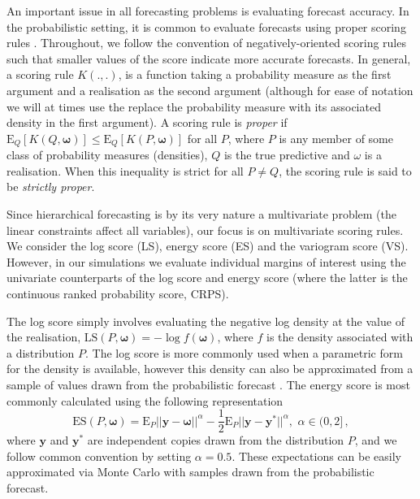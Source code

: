 \documentclass[12pt]{article}
\def\E{\text{E}}
\theoremstyle{definition}
\begin{document}
An important issue in all forecasting problems is evaluating forecast accuracy. In the probabilistic setting, it is common to evaluate forecasts using proper scoring rules \citep[see][and references therein]{Gneiting2007,Gneiting2014}. Throughout, we follow the convention of negatively-oriented scoring rules such that smaller values of the score indicate more accurate forecasts.  In general, a scoring rule $K(.,.)$, is a function taking a probability measure as the first argument and a realisation as the second argument (although for ease of notation we will at times use the replace the probability measure with its associated density in the first argument). A scoring rule is {\em proper} if $\E_{Q}[K(Q,\bm{\omega})] \le \E_{Q}[K(P,{\bm\omega})]$ for all $P$, where $P$ is any member of some class of probability measures (densities), $Q$ is the true predictive and $\omega$ is a realisation. When this inequality is strict for all $P\neq Q$, the scoring rule is said to be {\em strictly proper}.

Since hierarchical forecasting is by its very nature a multivariate problem (the linear constraints affect all variables), our focus is on multivariate scoring rules.  We consider the log score (LS), energy score (ES) and the variogram score (VS).  However, in our simulations we evaluate individual margins of interest using the univariate counterparts of the log score and energy score (where the latter is the continuous ranked probability score, CRPS).

The log score simply involves evaluating the negative log density at the value of the realisation, $\text{LS}(P,\bm\omega)=-\log f(\bm\omega)$, where $f$ is the density associated with a distribution $P$.  The log score is more commonly used when a parametric form for the density is available, however  this density can also be approximated from a sample of values drawn from the probabilistic forecast \citep[see][]{Jordan2017}.  The energy score is most commonly calculated using the following representation
\begin{equation*}\label{eq:Energy_score}
\text{ES}(P,\bm{\omega}) =
\E_{P}
||{\bm{y}}-\bm{\omega}||^\alpha -\frac{1}{2}\E_{P}||\bm{y}-\bm{y}^*||^\alpha, \,\, \alpha \in (0,2]\,,
\end{equation*}
where $\bm {y}$ and $\bm{y^*}$ are independent copies drawn from the distribution $P$, and we follow common convention by setting $\alpha=0.5$.  These expectations can be easily approximated via Monte Carlo with samples drawn from the probabilistic forecast.
\end{document}
